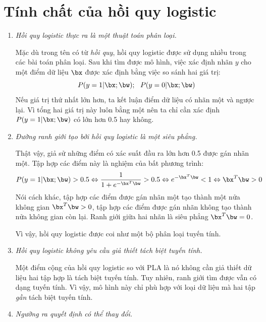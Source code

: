 \section{Tính chất của hồi quy logistic}
\begin{enumerate}
    \item \textit{Hồi quy logistic thực ra là một thuật toán phân loại.}

    Mặc dù trong tên có từ \textit{hồi quy}, hồi quy logistic được sử dụng nhiều
    trong các bài toán phân loại. Sau khi tìm được mô hình, việc xác định
    nhãn $y$ cho một điểm dữ liệu $\bx$ được xác định bằng việc so sánh
    hai giá trị:
    \begin{equation} 
    P(y = 1| \bx; \bw); ~~ P(y = 0| \bx; \bw)  
    \end{equation} 
    Nếu giá trị thứ nhất lớn hơn, ta kết luận điểm dữ liệu có nhãn một và
    ngược lại. Vì tổng hai giá trị này luôn bằng một nên ta chỉ cần xác định
    $P(y = 1| \bx; \bw)$ có lớn hơn 0.5 hay không.

 
 
    \item \textit{Đường ranh giới tạo bởi hồi quy logistic là một siêu phẳng.}
    
    Thật vậy, giả sử những điểm có xác suất đầu ra lớn hơn 0.5 được gán nhãn một. Tập hợp các điểm này là nghiệm của bất phương trình:
    \begin{eqnarray*} 
    P(y = 1| \bx; \bw) > 0.5 
    \Leftrightarrow \frac{1}{1 + e^{-\bx^T\bw}} > 0.5 
    \Leftrightarrow e^{-\bx^T\bw} < 1 
    \Leftrightarrow \bx^T\bw > 0 
    \end{eqnarray*} 
    Nói cách khác, tập hợp các điểm được gán nhãn một tạo thành một nửa không gian $\bx^T\bw > 0$, tập hợp các điểm được gán nhãn không tạo thành nửa không gian còn lại. Ranh giới giữa hai nhãn là siêu phẳng $\bx^T\bw = 0$. 

    Vì vậy, hồi quy logistic được coi như một bộ phân loại tuyến tính. 
    
    \item \textit{Hồi quy logistic không yêu cầu giả thiết tách biệt tuyến tính.}

    Một điểm cộng của hồi quy logistic so với PLA là nó không cần giả thiết dữ liệu hai tập hợp là tách biệt tuyến tính. Tuy nhiên, ranh giới tìm được vẫn có dạng tuyến tính. Vì vậy, mô hình này chỉ phù hợp với loại dữ liệu mà hai tập \textit{gần} tách biệt tuyến tính. 

    \item \textit{Ngưỡng ra quyết định có thể thay đổi.}


\end{enumerate}
